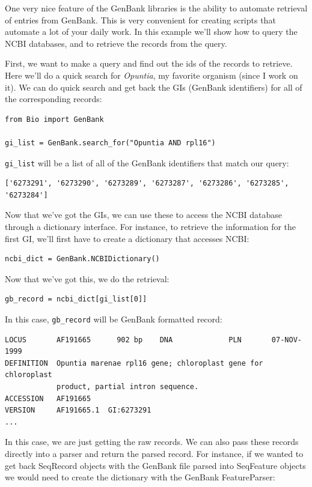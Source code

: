 \documentclass{report}
\begin{document}
One very nice feature of the GenBank libraries is the ability to automate retrieval of entries from GenBank. This is very convenient for creating scripts that automate a lot of your daily work. In this example we'll show how to query the NCBI databases, and to retrieve the records from the query.


First, we want to make a query and find out the ids of the records to retrieve. Here we'll do a quick search for \emph{Opuntia}, my favorite organism (since I work on it). We can do quick search and get back the GIs (GenBank identifiers) for all of the corresponding records:

\begin{verbatim}
from Bio import GenBank

gi_list = GenBank.search_for("Opuntia AND rpl16")
\end{verbatim}

\verb|gi_list| will be a list of all of the GenBank identifiers that match our query:

\begin{verbatim}
['6273291', '6273290', '6273289', '6273287', '6273286', '6273285', '6273284']
\end{verbatim}

Now that we've got the GIs, we can use these to access the NCBI database through a dictionary interface. For instance, to retrieve the information for the first GI, we'll first have to create a dictionary that accesses NCBI:

\begin{verbatim}
ncbi_dict = GenBank.NCBIDictionary()
\end{verbatim}

Now that we've got this, we do the retrieval:

\begin{verbatim}
gb_record = ncbi_dict[gi_list[0]]
\end{verbatim}

In this case, \verb|gb_record| will be GenBank formatted record:

\begin{verbatim}
LOCUS       AF191665      902 bp    DNA             PLN       07-NOV-1999
DEFINITION  Opuntia marenae rpl16 gene; chloroplast gene for chloroplast
            product, partial intron sequence.
ACCESSION   AF191665
VERSION     AF191665.1  GI:6273291
...
\end{verbatim}

In this case, we are just getting the raw records. We can also pass these records directly into a parser and return the parsed record. For instance, if we wanted to get back SeqRecord objects with the GenBank file parsed into SeqFeature objects we would need to create the dictionary with the GenBank FeatureParser:
\end{document}
